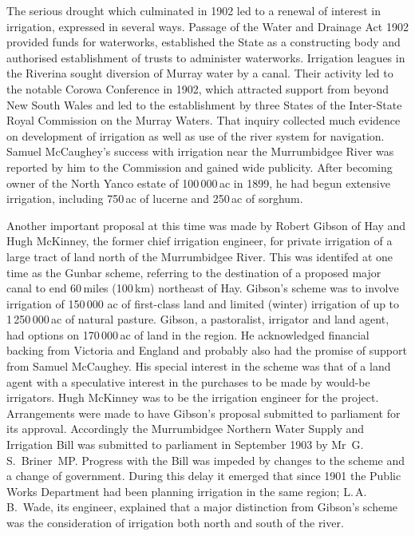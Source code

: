 The serious drought which culminated in 1902 led to a renewal of
interest in irrigation, expressed in several ways.  Passage of the
Water and Drainage Act 1902 provided funds for waterworks, established
the State as a constructing body and authorised establishment of
trusts to administer waterworks.  Irrigation leagues in the Riverina
sought diversion of Murray water by a canal.  Their activity led to
the notable Corowa Conference in 1902, which attracted support from
beyond New South Wales and led to the establishment by three States of
the Inter-State Royal Commission on the Murray Waters.  That inquiry
collected much evidence on development of irrigation as well as use of
the river system for navigation. Samuel McCaughey's success with
irrigation near the Murrumbidgee River was reported by him to the
Commission and gained wide publicity. After becoming owner of the
North Yanco estate of 100\,000\,ac in 1899, he had begun extensive
irrigation, including 750\,ac of lucerne and 250\,ac of
sorghum.


Another important proposal at this time was made by Robert Gibson of
Hay and Hugh McKinney, the former chief irrigation engineer, for
private irrigation of a large tract of land north of the Murrumbidgee
River.  This was identifed at one time as the Gunbar scheme, referring
to the destination of a proposed major canal to end 60\,miles
(100\,km) northeast of Hay.  Gibson's scheme was to involve irrigation
of 150\,000 ac of first-class land and limited (winter) irrigation of
up to 1\,250\,000\,ac of natural pasture.  Gibson, a pastoralist,
irrigator and land agent, had options on 170\,000\,ac of land in the
region.  He acknowledged financial backing from Victoria and England
and probably also had the promise of support from Samuel McCaughey.
His special interest in the scheme was that of a land agent with a
speculative interest in the purchases to be made by would-be
irrigators.  Hugh McKinney was to be the irrigation engineer for the
project.  Arrangements were made to have Gibson's proposal submitted
to parliament for its approval.  Accordingly the Murrumbidgee Northern
Water Supply and Irrigation Bill was submitted to parliament in
September 1903 by Mr~G.\,S.~Briner~MP.  Progress with the Bill was
impeded by changes to the scheme and a change of government. During
this delay it emerged that since 1901 the Public Works Department had
been planning irrigation in the same region; L.\,A.\,B.~Wade, its
engineer, explained that a major distinction from Gibson's scheme was
the consideration of irrigation both north and south of the
river.

